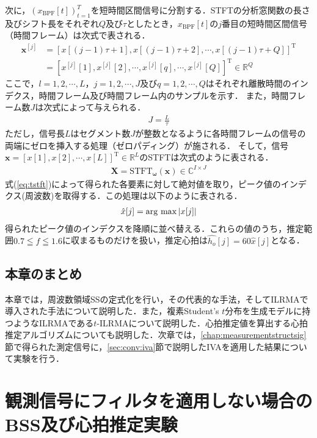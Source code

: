 次に，$\left(x_{\mathrm{BPF}}[t]\right)_{t=1}^{T}$を短時間区間信号に分割する．STFTの分析窓関数の長さ及びシフト長をそれぞれ$Q$及び$\tau$としたとき，$x_{\mathrm{BPF}}[t]$の$j$番目の短時間区間信号（時間フレーム）は次式で表される．
\begin{align}
  \nonumber \bm{x}^{[j]} &= \left[ x[(j-1)\tau +1], x[(j-1)\tau +2], \cdots, x[(j-1)\tau +Q] \right]^{\mathrm{T}} \\
  &=  [ x^{[j]} [1], x^{[j]} [2], \cdots, x^{[j]} [q], \cdots, x^{[j]} [Q] ]^{\mathrm{T}} \in \mathbb{R}^Q
\end{align}
ここで，$l =1, 2, \cdots, L$，$j=1, 2, \cdots, J$及び$q=1, 2, \cdots, Q$はそれぞれ離散時間のインデクス，時間フレーム及び時間フレーム内のサンプルを示す．
また，時間フレーム数$J$は次式によって与えられる．
\begin{align}
    J= \frac{L}{\tau}
\end{align}
ただし，信号長$L$はセグメント数$J$が整数となるように各時間フレームの信号の両端にゼロを挿入する処理（ゼロパディング）が施される．
そして，信号$\bm{x} = [ x[1], x[2], \cdots, x[L] ]^{\mathrm{T}}  \in \mathbb{R}^L$のSTFTは次式のように表される．
\begin{align}
    \bm{X} = \mathrm{STFT}_{\bm{\omega}}(\bm{x}) \in \mathbb{C}^{I \times J}  \label{eq:tstft}
\end{align}
式(\ref{eq:tstft})によって得られた各要素に対して絶対値を取り，ピーク値のインデクス(周波数)を取得する．この処理は以下のように表される．
\begin{align}
    \hat{x}[j]=\mathop{\mathrm{arg~max}}\limits|x[j]|  \label{eq:searchmax}
\end{align}
得られたピーク値のインデクスを降順に並べ替える．これらの値のうち，推定範囲$0.7\leqq f \leqq 1.6$に収まるものだけを扱い，推定心拍は$\hat{h_{o}}[j]=60\hat{x}[j]$となる．

\section{本章のまとめ}
本章では，周波数領域SSの定式化を行い，その代表的な手法，そしてILRMAで導入された手法について説明した．また，複素Student's $t$分布を生成モデルに持つようなILRMAである$t$-ILRMAについて説明した．心拍推定値を算出する心拍推定アルゴリズムについても説明した．次章では，\ref{chap:measurementstructsig}節で得られた測定信号に，\ref{sec:conv:iva}節で説明したIVAを適用した結果について実験を行う．

\chapter{観測信号にフィルタを適用しない場合のBSS及び心拍推定実験}
\label{chap:bsshrexp}

